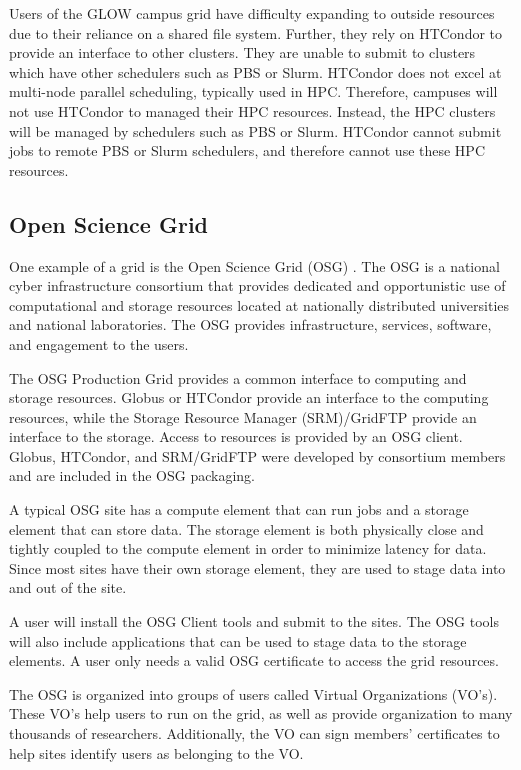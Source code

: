 Users of the GLOW campus grid have difficulty expanding to outside resources due to their reliance on a shared file system.  Further, they rely on HTCondor to provide an interface to other clusters.  They are unable to submit to clusters which have other schedulers such as PBS or Slurm.  HTCondor does not excel at multi-node parallel scheduling, typically used in HPC.  Therefore, campuses will not use HTCondor to managed their HPC resources.  Instead, the HPC clusters will be managed by schedulers such as PBS or Slurm.  HTCondor cannot submit jobs to remote PBS or Slurm schedulers, and therefore cannot use these HPC resources.



\subsection{Open Science Grid}
One example of a grid is the Open Science Grid (OSG) \cite{pordes2007open}. The OSG is a national cyber infrastructure consortium that provides dedicated and opportunistic use of computational and storage resources located at nationally distributed universities and national laboratories. The OSG provides infrastructure, services, software, and engagement to the users.  

The OSG Production Grid provides a common interface to computing and storage resources. Globus or HTCondor provide an interface to the computing resources, while the Storage Resource Manager (SRM)/GridFTP provide an interface to the storage.  Access to resources is provided by an OSG client.  Globus, HTCondor, and SRM/GridFTP were developed by consortium members and are included in the OSG packaging.

A typical OSG site has a compute element that can run jobs and a storage element that can store data.  The storage element is both physically close and tightly coupled to the compute element in order to minimize latency for data.  Since most sites have their own storage element, they are used to stage data into and out of the site.

A user will install the OSG Client tools and submit to the sites.  The OSG tools will also include applications that can be used to stage data to the storage elements.  A user only needs a valid OSG certificate to access the grid resources.  

The OSG is organized into groups of users called Virtual Organizations (VO's).  These VO's help users to run on the grid, as well as provide organization to many thousands of researchers.  Additionally, the VO can sign members' certificates to help sites identify users as belonging to the VO.

